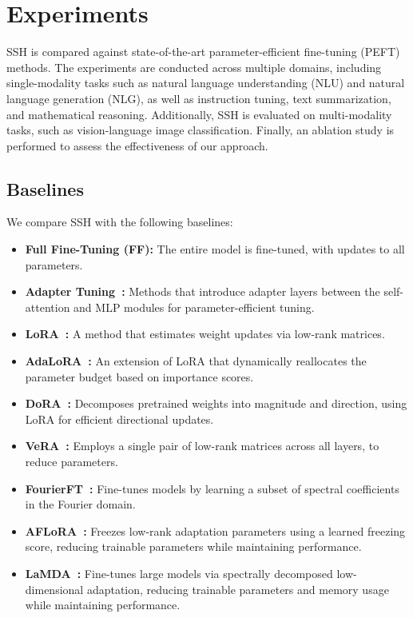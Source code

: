 \section{Experiments}
SSH is compared against state-of-the-art parameter-efficient fine-tuning (PEFT) methods. The experiments are conducted across multiple domains, including single-modality tasks such as natural language understanding (NLU) and natural language generation (NLG), as well as instruction tuning, text summarization, and mathematical reasoning. Additionally, SSH is evaluated on multi-modality tasks, such as vision-language image classification. Finally, an ablation study is performed to assess the effectiveness of our approach.



\subsection{Baselines}
We compare SSH with the following baselines:
\begin{itemize}
    \item \textbf{Full Fine-Tuning (FF):} The entire model is fine-tuned, with updates to all parameters.
    \item \textbf{Adapter Tuning~\cite{houlsby2019parameter,lin2020exploring,ruckle2020adapterdrop,pfeiffer2020adapterfusion}:} Methods that introduce adapter layers between the self-attention and MLP modules for parameter-efficient tuning.
    \item \textbf{LoRA~\cite{hu2022lora}:} A method that estimates weight updates via low-rank matrices.
    \item \textbf{AdaLoRA~\cite{zhang2303adaptive}:} An extension of LoRA that dynamically reallocates the parameter budget based on importance scores.
    \item \textbf{DoRA~\cite{liu2024dora}:} Decomposes pretrained weights into magnitude and direction, using LoRA for efficient directional updates.
    \item \textbf{VeRA~\cite{kopiczko2023vera}:} Employs a single pair of low-rank matrices across all layers, to reduce parameters.
    \item \textbf{FourierFT~\cite{gao2024parameter}:} Fine-tunes models by learning a subset of spectral coefficients in the Fourier domain.
    \item 
    \textbf{AFLoRA~\cite{liu2024aflora}:} Freezes low-rank adaptation parameters using a learned freezing score, reducing trainable parameters while maintaining performance.
    \item 
    \textbf{LaMDA~\cite{azizi2024lamda}:} Fine-tunes large models via spectrally decomposed low-dimensional adaptation, reducing trainable parameters and memory usage while maintaining performance.
    
\end{itemize}


